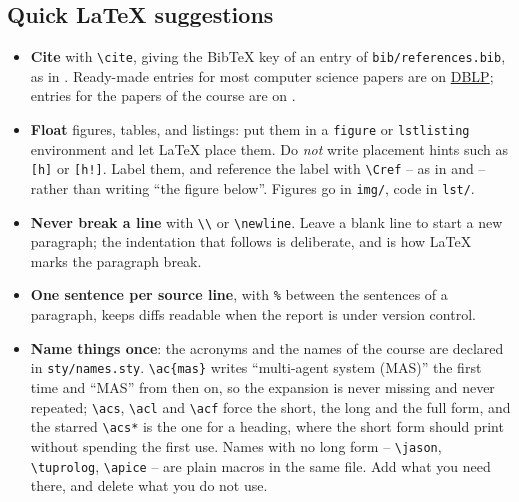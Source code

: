 \documentclass[11pt,a4paper]{scrartcl}
\begin{document}
\begin{guidance}
\section*{Quick \LaTeX{} suggestions}

\begin{itemize}
  \item \textbf{Cite} with \texttt{\textbackslash cite}, giving the BibTeX key of an entry of \texttt{bib/references.bib}, as in \cite{book-woa25y}. Ready-made entries for most computer science papers are on \href{https://dblp.org/}{DBLP}; entries for the papers of the course are on \href{https://apice.unibo.it/}{\apice}.

  \item \textbf{Float} figures, tables, and listings: put them in a \texttt{figure} or \texttt{lstlisting} environment and let \LaTeX{} place them. Do \emph{not} write placement hints such as \texttt{[h]} or \texttt{[h!]}. Label them, and reference the label with \texttt{\textbackslash Cref} – as in  and  – rather than writing ``the figure below''. Figures go in \texttt{img/}, code in \texttt{lst/}.

  \item \textbf{Never break a line} with \texttt{\textbackslash\textbackslash} or \texttt{\textbackslash newline}. Leave a blank line to start a new paragraph; the indentation that follows is deliberate, and is how \LaTeX{} marks the paragraph break.

  \item \textbf{One sentence per source line}, with \texttt{\%} between the sentences of a paragraph, keeps diffs readable when the report is under version control.

  \item \textbf{Name things once}: the acronyms and the names of the course are declared in \texttt{sty/names.sty}. \texttt{\textbackslash ac\{mas\}} writes ``multi-agent system (MAS)'' the first time and ``MAS'' from then on, so the expansion is never missing and never repeated; \texttt{\textbackslash acs}, \texttt{\textbackslash acl} and \texttt{\textbackslash acf} force the short, the long and the full form, and the starred \texttt{\textbackslash acs*} is the one for a heading, where the short form should print without spending the first use. Names with no long form – \texttt{\textbackslash jason}, \texttt{\textbackslash tuprolog}, \texttt{\textbackslash apice} – are plain macros in the same file. Add what you need there, and delete what you do not use.


\end{itemize}
\end{guidance}
\end{document}
